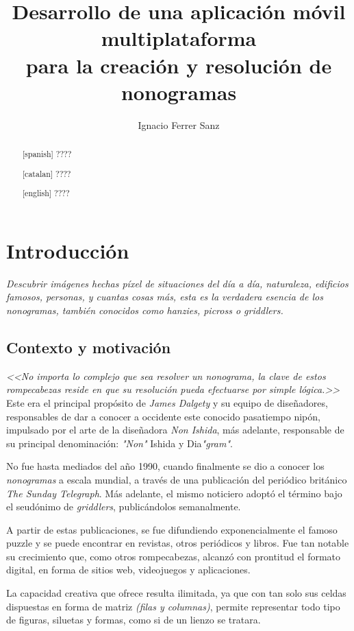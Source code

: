\documentclass[11pt,spanish,listoffigures,listoftables]{tfgetsinf}
\title{Desarrollo de una aplicación móvil multiplataforma \\
para la creación y resolución de nonogramas}
\author{Ignacio Ferrer Sanz}
\begin{document}

\begin{abstract}[spanish]
????
\end{abstract}
\begin{abstract}[catalan]
   ????
\end{abstract}
\begin{abstract}[english]
????
\end{abstract}

\mainmatter

\chapter{Introducción}

\textit{Descubrir imágenes hechas píxel de situaciones del día a día,
naturaleza, edificios famosos, personas, y cuantas cosas más, esta es la verdadera esencia de
los nonogramas, también conocidos como hanzies, picross o griddlers.}

\section{Contexto y motivación}

\textit{<<No importa lo complejo que sea resolver un nonograma, la clave de
estos rompecabezas reside en que su resolución pueda efectuarse por simple
lógica.>>} Este era el principal propósito de \textit{James Dalgety} y su equipo
de diseñadores, responsables de dar a conocer a occidente este conocido
pasatiempo nipón, impulsado por el arte de la diseñadora \textit{Non Ishida}, más
adelante, responsable de su principal denominación: \textit{"Non"} Ishida y
Dia\textit{"gram"}.

No fue hasta mediados del año 1990, cuando finalmente se dio a conocer los \textit{nonogramas} a escala
mundial, a través de una publicación del periódico británico \textit{The Sunday
Telegraph}. Más adelante, el mismo noticiero adoptó el término bajo el
seudónimo de \textit{griddlers}, publicándolos semanalmente.

A partir de estas publicaciones, se fue difundiendo exponencialmente el famoso puzzle y
se puede encontrar en revistas, otros periódicos y libros. Fue tan notable su
crecimiento que, como otros rompecabezas, alcanzó con prontitud el formato
digital, en forma de sitios web, videojuegos y aplicaciones.

La capacidad creativa que ofrece resulta ilimitada, ya que con tan solo sus
celdas dispuestas en forma de matriz \textit{(filas y columnas)}, permite
representar todo tipo de figuras, siluetas y formas, como si de un lienzo se
tratara. 
\end{document}
